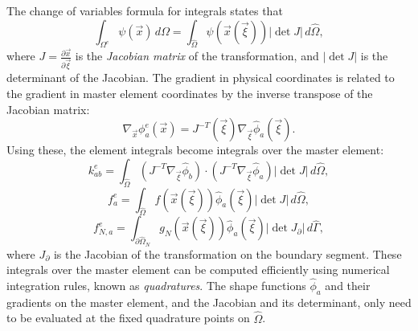 The change of variables formula for integrals states that
\begin{equation}
    \int_{\Omega^e} \psi(\vec{x}) \, d\Omega = \int_{\hat{\Omega}} \psi(\vec{x}(\vec{\xi})) |\det J| \, d\hat{\Omega},
\end{equation}
where $J = \frac{\partial \vec{x}}{\partial \vec{\xi}}$ is the \emph{Jacobian matrix} of the transformation, and $|\det J|$ is the determinant of the Jacobian. The gradient in physical coordinates is related to the gradient in master element coordinates by the inverse transpose of the Jacobian matrix:
\begin{equation}
    \nabla_{\vec{x}} \phi_a^e(\vec{x}) = J^{-T}(\vec{\xi}) \nabla_{\vec{\xi}} \hat{\phi}_a(\vec{\xi}).
\end{equation}
Using these, the element integrals become integrals over the master element:
\begin{equation}
    k_{ab}^e = \int_{\hat{\Omega}} (J^{-T} \nabla_{\vec{\xi}} \hat{\phi}_b) \cdot (J^{-T} \nabla_{\vec{\xi}} \hat{\phi}_a) |\det J| \, d\hat{\Omega},
\end{equation}
\begin{equation}
    f_a^e = \int_{\hat{\Omega}} f(\vec{x}(\vec{\xi})) \hat{\phi}_a(\vec{\xi}) |\det J| \, d\hat{\Omega},
\end{equation}
\begin{equation}
    f_{N,a}^e = \int_{\partial\hat{\Omega}_N} g_N(\vec{x}(\vec{\xi})) \hat{\phi}_a(\vec{\xi}) |\det J_{\partial}| \, d\hat{\Gamma},
\end{equation}
where $J_\partial$ is the Jacobian of the transformation on the boundary segment. These integrals over the master element can be computed efficiently using numerical integration rules, known as \emph{quadratures}. The shape functions $\hat{\phi}_a$ and their gradients on the master element, and the Jacobian and its determinant, only need to be evaluated at the fixed quadrature points on $\hat{\Omega}$.

